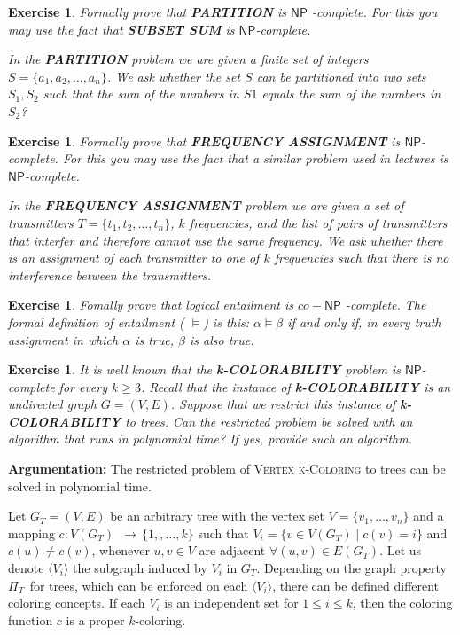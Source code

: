 \documentclass[11pt]{article}
\newtheorem{exercise}[theorem]{Exercise}
\begin{document}
\begin{exercise}
\label{ex:partition} Formally prove that \textbf{PARTITION} is $\mathsf{NP}$%
-complete. For this you may use the fact that \textbf{SUBSET SUM} is $%
\mathsf{NP}$-complete.

\smallskip \noindent In the \textbf{PARTITION} problem we are given a finite
set of integers $S=\{a_{1},a_{2},\ldots ,a_{n}\}$. We ask whether the set $S$
can be partitioned into two sets $S_{1},S_{2}$ such that the sum of the
numbers in $S1$ equals the sum of the numbers in $S_{2}$?
\end{exercise}

\begin{exercise}
\label{ex:frequency} Formally prove that \textbf{FREQUENCY ASSIGNMENT} is $%
\mathsf{NP}$-complete. For this you may use the fact that a similar problem
used in lectures is $\mathsf{NP}$-complete.

\noindent In the \textbf{FREQUENCY ASSIGNMENT} problem we are given a set of
transmitters $T=\{t_{1},t_{2},\ldots ,t_{n}\}$, $k$ frequencies, and the
list of pairs of transmitters that interfer and therefore cannot use the
same frequency. We ask whether there is an assignment of each transmitter to
one of $k$ frequencies such that there is no interference between the
transmitters.
\end{exercise}

\begin{exercise}
\label{ex:CO-NP} Fomally prove that logical entailment is $co-\mathsf{NP}$%
-complete. The formal definition of entailment ( $\models $) is this: $%
\alpha \models \beta $ if and only if, in every truth assignment in which $%
\alpha $ is true, $\beta $ is also true.
\end{exercise}

\begin{exercise}
\label{ex:Colors} It is well known that the \textbf{k-COLORABILITY} problem
is $\mathsf{NP}$-complete for every $k\geq 3$. Recall that the instance of 
\textbf{k-COLORABILITY} is an undirected graph $G=(V,E)$. Suppose that we
restrict this instance of \textbf{k-COLORABILITY} to trees. Can the
restricted problem be solved with an algorithm that runs in polynomial time?
If yes, provide such an algorithm.
\end{exercise}

\textbf{Argumentation:}
The restricted problem of \textsc{Vertex k-Coloring} to trees can be
solved in polynomial time.

Let $G_{T}=(V,E)$ be an arbitrary tree with the vertex set $V=\{v_{1},\ldots
,v_{n}\}$ and a mapping $c:V(G_{T})\,$ $\longrightarrow \,\{1,,\ldots ,k\}$
such that $V_{i}=\{v\in V(G_{T})\mid c(v)=i\}$ and $c(u)\neq c(v)$, whenever 
$u,v\in V$ are adjacent $\forall (u,v)\in E(G_{T})$. Let us denote $\langle
V_{i}\rangle $ the subgraph induced by $V_{i}$ in $G_{T}$. Depending on the
graph property $\Pi _{T\text{ }}$for trees, which can be enforced on each $%
\langle V_{i}\rangle $, there can be defined different coloring concepts. If
each $V_{i}$ is an independent set for $1\leq i\leq k$, then the coloring
function $c$ is a proper $k$-coloring.
\end{document}
